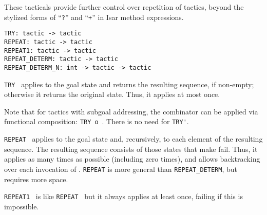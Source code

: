 \begin{isabellebody}
\begin{isamarkuptext}
\begin{description}
  \end{description}%
\end{isamarkuptext}%
\isamarkuptrue%
%
\endisatagmlref
{\isafoldmlref}%
%
\isadelimmlref
%
\endisadelimmlref
%
\isamarkuptrue%
%
\begin{isamarkuptext}%
These tacticals provide further control over repetition of
  tactics, beyond the stylized forms of ``\verb|?|''  and
  ``\verb|+|'' in Isar method expressions.%
\end{isamarkuptext}%
\isamarkuptrue%
%
\isadelimmlref
%
\endisadelimmlref
%
\isatagmlref
%
\begin{isamarkuptext}%
\begin{mldecls}
  \verb|TRY: tactic -> tactic| \\
  \verb|REPEAT: tactic -> tactic| \\
  \verb|REPEAT1: tactic -> tactic| \\
  \verb|REPEAT_DETERM: tactic -> tactic| \\
  \verb|REPEAT_DETERM_N: int -> tactic -> tactic| \\
  \end{mldecls}

  \begin{description}

  \item \verb|TRY|~ applies  to the goal
  state and returns the resulting sequence, if non-empty; otherwise it
  returns the original state.  Thus, it applies  at most
  once.

  Note that for tactics with subgoal addressing, the combinator can be
  applied via functional composition: \verb|TRY|~\verb|o|~.  There is no need for \verb|TRY'|.

  \item \verb|REPEAT|~ applies  to the goal
  state and, recursively, to each element of the resulting sequence.
  The resulting sequence consists of those states that make  fail.  Thus, it applies  as many times as
  possible (including zero times), and allows backtracking over each
  invocation of .  \verb|REPEAT| is more general than \verb|REPEAT_DETERM|, but requires more space.

  \item \verb|REPEAT1|~ is like \verb|REPEAT|~
  but it always applies  at least once, failing if this
  is impossible.


\end{description}
\end{isamarkuptext}
\end{isabellebody}
